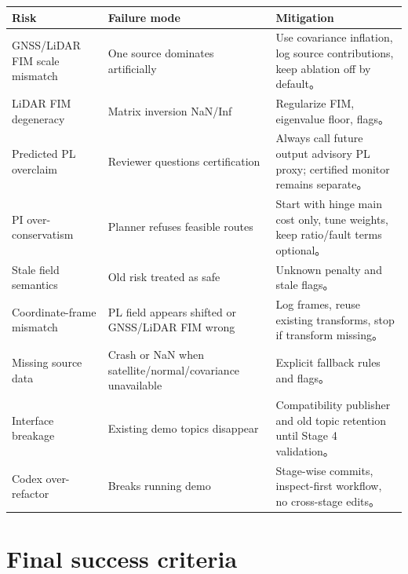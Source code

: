 \documentclass[11pt,a4paper]{article}
\begin{document}
\begin{center}
\small
\begin{tabularx}{\linewidth}{lY Y}
  \toprule
  \textbf{Risk} & \textbf{Failure mode} & \textbf{Mitigation} \\
  \midrule
  GNSS/LiDAR FIM scale mismatch & One source dominates artificially & Use covariance inflation, log source contributions, keep ablation off by default。\\
  LiDAR FIM degeneracy & Matrix inversion NaN/Inf & Regularize FIM, eigenvalue floor, flags。\\
  Predicted PL overclaim & Reviewer questions certification & Always call future output advisory PL proxy; certified monitor remains separate。\\
  PI over-conservatism & Planner refuses feasible routes & Start with hinge main cost only, tune weights, keep ratio/fault terms optional。\\
  Stale field semantics & Old risk treated as safe & Unknown penalty and stale flags。\\
  Coordinate-frame mismatch & PL field appears shifted or GNSS/LiDAR FIM wrong & Log frames, reuse existing transforms, stop if transform missing。\\
  Missing source data & Crash or NaN when satellite/normal/covariance unavailable & Explicit fallback rules and flags。\\
  Interface breakage & Existing demo topics disappear & Compatibility publisher and old topic retention until Stage 4 validation。\\
  Codex over-refactor & Breaks running demo & Stage-wise commits, inspect-first workflow, no cross-stage edits。\\
  \bottomrule
\end{tabularx}
\end{center}

\section{Final success criteria}
\end{document}
